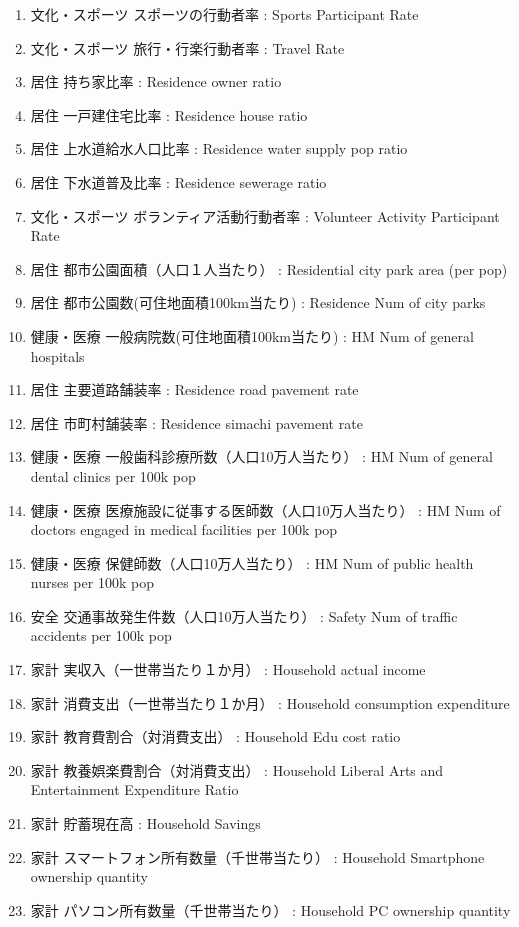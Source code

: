 \begin{multicols}{2}
\begin{enumerate}
  \item 文化・スポーツ スポーツの行動者率  :  Sports Participant Rate
  \item 文化・スポーツ 旅行・行楽行動者率  :  Travel Rate
  \item 居住 持ち家比率  :  Residence owner ratio
  \item 居住 一戸建住宅比率  :  Residence house ratio
  \item 居住 上水道給水人口比率  :  Residence water supply pop ratio
  \item 居住 下水道普及比率  :  Residence sewerage ratio
  \item 文化・スポーツ ボランティア活動行動者率  :  Volunteer Activity Participant Rate
  \item 居住 都市公園面積（人口１人当たり）  :  Residential city park area (per pop)
  \item 居住 都市公園数(可住地面積100km当たり)  :  Residence Num of city parks
  \item 健康・医療 一般病院数(可住地面積100km当たり)  :  HM Num of general hospitals
  \item 居住 主要道路舗装率  :  Residence road pavement rate
  \item 居住 市町村舗装率  :  Residence simachi pavement rate
  \item 健康・医療 一般歯科診療所数（人口10万人当たり）  :  HM Num of general dental clinics per 100k pop
  \item 健康・医療 医療施設に従事する医師数（人口10万人当たり）  :  HM Num of doctors engaged in medical facilities per 100k pop
  \item 健康・医療 保健師数（人口10万人当たり）  :  HM Num of public health nurses per 100k pop
  \item 安全 交通事故発生件数（人口10万人当たり）  :  Safety Num of traffic accidents per 100k pop
  \item 家計 実収入（一世帯当たり１か月）  :  Household actual income
  \item 家計 消費支出（一世帯当たり１か月）  :  Household consumption expenditure
  \item 家計 教育費割合（対消費支出）  :  Household Edu cost ratio
  \item 家計 教養娯楽費割合（対消費支出）  :  Household Liberal Arts and Entertainment Expenditure Ratio
  \item 家計 貯蓄現在高  :  Household Savings
  \item 家計 スマートフォン所有数量（千世帯当たり）  :  Household Smartphone ownership quantity
  \item 家計 パソコン所有数量（千世帯当たり）  :  Household PC ownership quantity

\end{enumerate}
\end{multicols}
